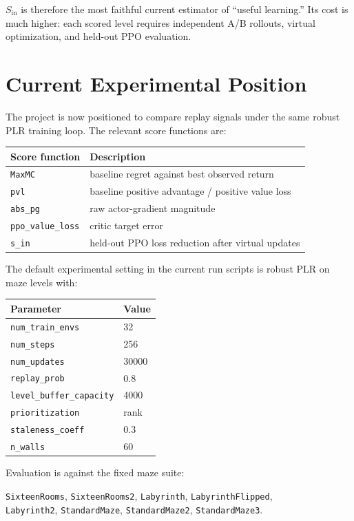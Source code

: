 \documentclass[11pt]{article}
\begin{document}
$S_{\mathrm{in}}$ is therefore the most faithful current estimator of ``useful learning.''
Its cost is much higher: each scored level requires independent A/B rollouts,
virtual optimization, and held-out PPO evaluation.

\section{Current Experimental Position}

The project is now positioned to compare replay signals under the same robust
PLR training loop. The relevant score functions are:
\begin{center}
\begin{tabular}{@{}ll@{}}
\toprule
Score function & Description \\
\midrule
\texttt{MaxMC} & baseline regret against best observed return \\
\texttt{pvl} & baseline positive advantage / positive value loss \\
\texttt{abs\_pg} & raw actor-gradient magnitude \\
\texttt{ppo\_value\_loss} & critic target error \\
\texttt{s\_in} & held-out PPO loss reduction after virtual updates \\
\bottomrule
\end{tabular}
\end{center}

The default experimental setting in the current run scripts is robust PLR on
maze levels with:
\begin{center}
\begin{tabular}{@{}ll@{}}
\toprule
Parameter & Value \\
\midrule
\texttt{num\_train\_envs} & 32 \\
\texttt{num\_steps} & 256 \\
\texttt{num\_updates} & 30000 \\
\texttt{replay\_prob} & 0.8 \\
\texttt{level\_buffer\_capacity} & 4000 \\
\texttt{prioritization} & rank \\
\texttt{staleness\_coeff} & 0.3 \\
\texttt{n\_walls} & 60 \\
\bottomrule
\end{tabular}
\end{center}

Evaluation is against the fixed maze suite:
\begin{center}
\texttt{SixteenRooms}, \texttt{SixteenRooms2}, \texttt{Labyrinth}, \texttt{LabyrinthFlipped},\\
\texttt{Labyrinth2}, \texttt{StandardMaze}, \texttt{StandardMaze2}, \texttt{StandardMaze3}.
\end{center}
\end{document}
